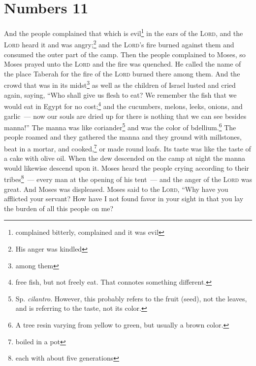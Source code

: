 \section{Numbers 11}\label{Numbers 11}
\begin{enumerate}[align=center]
     And the people complained that which is evil\footnote{complained bitterly, complained and it was evil} in the ears of the \textsc{Lord}, and the \textsc{Lord} heard it and was angry;\footnote{His anger was kindled} and the \textsc{Lord}'s fire burned against them and consumed the outer part of the camp.%
     Then the people complained to Moses, so Moses prayed unto the \textsc{Lord} and the fire was quenched.%
     He called the name of the place Taberah for the fire of the \textsc{Lord} burned there among them.%
     And the crowd that was in its midst\footnote{among them} as well as the children of Israel lusted and cried again, saying, ``Who shall give us flesh to eat?%
     We remember the fish that we would eat in Egypt for no cost;\footnote{free fish, but not freely eat. That connotes something different.} and the cucumbers, melons, leeks, onions, and garlic~---%
     now our souls are dried up for there is nothing that we can see besides manna!''%
     The manna was like coriander\footnote{Sp. \emph{cilantro}. However, this probably refers to the fruit (seed), not the leaves, and is referring to the taste, not its color.} and was the color of bdellium.\footnote{A tree resin varying from yellow to green, but usually a brown color.}%
     The people roamed and they gathered the manna and they ground with millstones, beat in a mortar, and cooked,\footnote{boiled in a pot} or made round loafs. Its taste was like the taste of a cake with olive oil.%
     When the dew descended on the camp at night the manna would likewise descend upon it.%
     Moses heard the people crying according to their tribes\footnote{each with about five generations}~--- every man at the opening of his tent~--- and the anger of the \textsc{Lord} was great. And Moses was displeased.%
     Moses said to the \textsc{Lord}, ``Why have you afflicted your servant? How have I not found favor in your sight in that you lay the burden of all this people on me?%

\end{enumerate}
